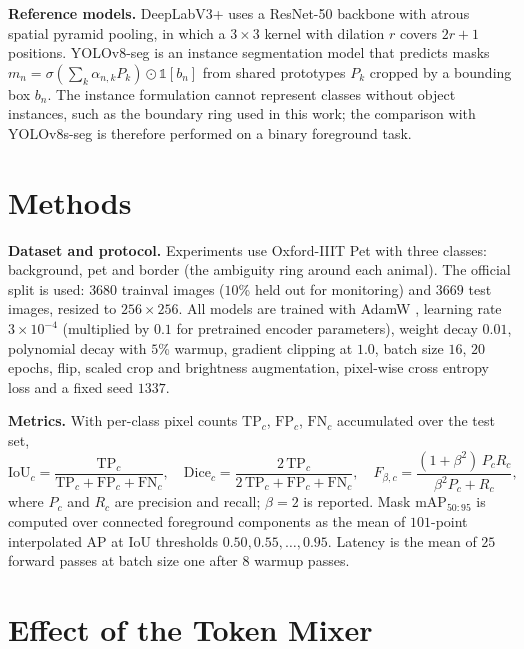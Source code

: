 \documentclass[3p,times,number]{elsarticle}
\begin{document}
\textbf{Reference models.} DeepLabV3+ \cite{deeplabv3plus} uses a ResNet-50 backbone
\cite{resnet} with atrous spatial pyramid pooling, in which a $3 \times 3$ kernel with
dilation $r$ covers $2r+1$ positions. YOLOv8-seg \cite{yolov8} is an instance segmentation
model that predicts masks $m_n = \sigma(\sum_k \alpha_{n,k} P_k) \odot \mathbb{1}[b_n]$
from shared prototypes $P_k$ cropped by a bounding box $b_n$. The instance formulation
cannot represent classes without object instances, such as the boundary ring used in this
work; the comparison with YOLOv8s-seg is therefore performed on a binary foreground task.

\section{Methods}

\textbf{Dataset and protocol.} Experiments use Oxford-IIIT Pet \cite{pets} with three
classes: background, pet and border (the ambiguity ring around each animal). The official
split is used: $3680$ trainval images ($10$\% held out for monitoring) and $3669$ test
images, resized to $256 \times 256$. All models are trained with AdamW \cite{adamw},
learning rate $3 \times 10^{-4}$ (multiplied by $0.1$ for pretrained encoder parameters),
weight decay $0.01$, polynomial decay with $5$\% warmup, gradient clipping at $1.0$, batch
size $16$, $20$ epochs, flip, scaled crop and brightness augmentation, pixel-wise cross
entropy loss and a fixed seed $1337$.

\textbf{Metrics.} With per-class pixel counts $\mathrm{TP}_c$, $\mathrm{FP}_c$,
$\mathrm{FN}_c$ accumulated over the test set,
$$
\mathrm{IoU}_c = \frac{\mathrm{TP}_c}{\mathrm{TP}_c + \mathrm{FP}_c + \mathrm{FN}_c},
\quad
\mathrm{Dice}_c = \frac{2\,\mathrm{TP}_c}{2\,\mathrm{TP}_c + \mathrm{FP}_c + \mathrm{FN}_c},
\quad
F_{\beta,c} = \frac{(1 + \beta^{2})\, P_c R_c}{\beta^{2} P_c + R_c},
$$
where $P_c$ and $R_c$ are precision and recall; $\beta = 2$ is reported. Mask
$\mathrm{mAP}_{50:95}$ is computed over connected foreground components as the mean of
$101$-point interpolated AP at IoU thresholds $0.50, 0.55, \dots, 0.95$. Latency is the
mean of $25$ forward passes at batch size one after $8$ warmup passes.

\section{Effect of the Token Mixer}
\end{document}
